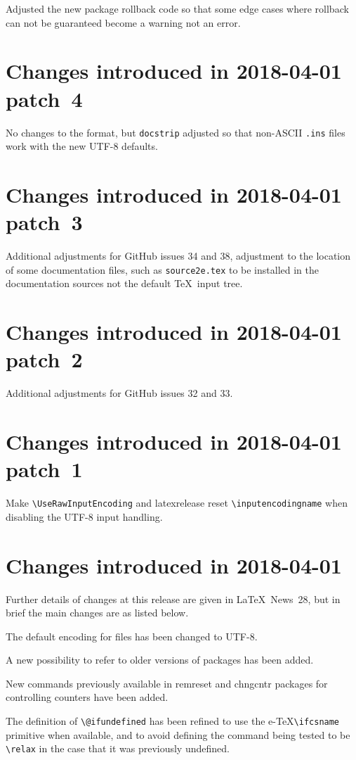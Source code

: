 \documentclass{ltxguide}
\newcommand\Lpack[1]{\mbox{\textsf{#1}}}
\newcommand\ghissue[1]{#1}
\newcommand\ltnewsissue[1]{\LaTeX\ News~#1}
\newcommand\ghissue[1]{%
    \href{https://github.com/latex3/latex2e/issues/#1}{#1}}
\newcommand\ltnewsissue[1]{%
    \href{https://www.latex-project.org/news/latex2e-news/ltnews#1.pdf}{\LaTeX\ News~#1}}
\begin{document}
Adjusted the new package rollback code so that some edge cases where rollback
can not be guaranteed become a warning not an error.

\section{Changes  introduced in 2018-04-01 patch~4}
No changes to the format, but \texttt{docstrip} adjusted so that non-ASCII
\texttt{.ins} files work with the new UTF-8 defaults.

\section{Changes  introduced in 2018-04-01 patch~3}
Additional adjustments for GitHub issues \ghissue{34} and \ghissue{38}, adjustment to the
location of some documentation files, such as \texttt{source2e.tex} to
be installed in the documentation sources not the default \TeX\ input
tree.


\section{Changes  introduced in 2018-04-01 patch~2}
Additional adjustments for GitHub issues  \ghissue{32} and  \ghissue{33}.

\section{Changes  introduced in 2018-04-01 patch~1}
Make \verb|\UseRawInputEncoding| and \Lpack{latexrelease} reset \verb|\inputencodingname|
when disabling the UTF-8 input handling.

\section{Changes  introduced in 2018-04-01}
Further details of changes at this release are given in \ltnewsissue{28}, but in brief
the main changes are as listed below.

The default encoding for files has been changed to UTF-8.

A new possibility to refer to older versions of packages has been added.

New commands previously available in \Lpack{remreset} and
\Lpack{chngcntr} packages for controlling counters have been added.

The definition of \verb|\@ifundefined| has been refined to use the e-\TeX \verb|\ifcsname|
primitive when available, and to avoid defining the command being tested to be \verb|\relax|
in the case that it was previously undefined.
\end{document}
